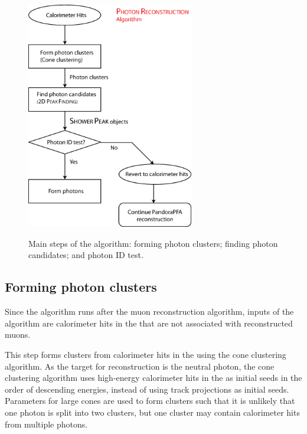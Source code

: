\begin{figure}[tbph]
\centering
{\includegraphics[width=0.65\textwidth]{photon/photonRecoFlow3}}
\caption[A flow diagram of the \PhotonReconstruction algorithm.]
{Main steps of the \PhotonReconstruction algorithm: forming photon clusters; finding photon candidates; and photon ID test.}
\label{fig:photonPhotonRecoFlow}
\end{figure}


\subsection{Forming photon clusters}

Since the \PhotonReconstruction algorithm runs after the muon reconstruction algorithm, inputs of the \PhotonReconstruction algorithm are calorimeter hits in the \ECAL that are not associated with reconstructed muons.

This step forms clusters from calorimeter hits in the \ECAL using the cone clustering algorithm. As the target for reconstruction is the neutral photon, the cone clustering algorithm uses high-energy calorimeter hits in the \ECAL as initial seeds in the order of descending energies, instead of using track projections as initial seeds.  Parameters for large cones are used to form clusters such that it is unlikely that one photon is split into two clusters, but one cluster may contain calorimeter hits from  multiple photons.

